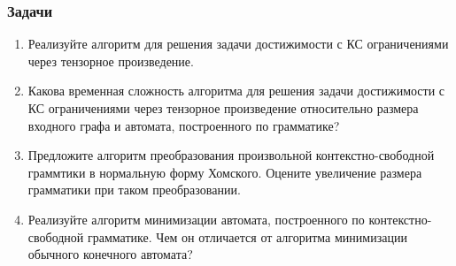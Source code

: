 \documentclass[xcolor=table]{beamer}
\begin{document}
\begin{frame} \frametitle{Задачи}

\begin{enumerate}
\item Реализуйте алгоритм для решения задачи достижимости с КС ограничениями через тензорное произведение.
\item Какова временная сложность алгоритма для решения задачи достижимости с КС ограничениями через тензорное произведение относительно размера входного графа и автомата, построенного по грамматике? 
\item Предложите алгоритм преобразования произвольной контекстно-свободной граммтики в нормальную форму Хомского. Оцените увеличение размера грамматики при таком преобразовании.
\item Реализуйте алгоритм минимизации автомата, построенного по контекстно-свободной грамматике. Чем он отличается от алгоритма минимизации обычного конечного автомата?
\end{enumerate}

\end{frame}
\end{document}
